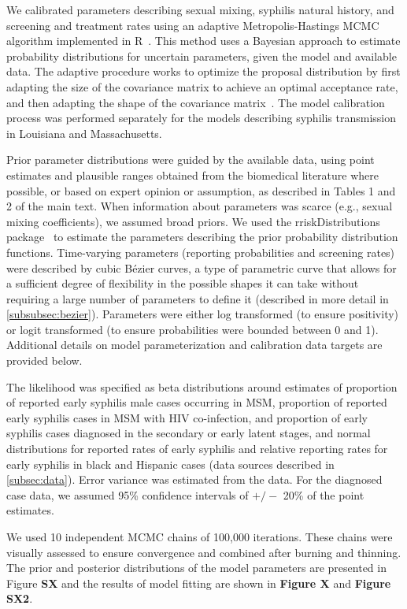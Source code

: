 \documentclass[a4paper]{article}
\begin{document}
We calibrated parameters describing sexual mixing, syphilis natural history, and screening and treatment rates using an adaptive Metropolis-Hastings MCMC algorithm implemented in R~\autocite{Camacho2016}. This method uses a Bayesian approach to estimate probability distributions for uncertain parameters, given the model and available data. The adaptive procedure works to optimize the proposal distribution by first adapting the size of the covariance matrix to achieve an optimal acceptance rate, and then adapting the shape of the covariance matrix~\autocite{Camacho2015}. The model calibration process was performed separately for the models describing syphilis transmission in Louisiana and Massachusetts.

Prior parameter distributions were guided by the available data, using point estimates and plausible ranges obtained from the biomedical literature where possible, or based on expert opinion or assumption, as described in Tables 1 and 2 of the main text. When information about parameters was scarce (e.g., sexual mixing coefficients), we assumed broad priors. We used the rriskDistributions package~\autocite{Belgorodski2016} to estimate the parameters describing the prior probability distribution functions. Time-varying parameters (reporting probabilities and screening rates) were described by cubic Bézier curves, a type of parametric curve that allows for a sufficient degree of flexibility in the possible shapes it can take without requiring a large number of parameters to define it (described in more detail in \ref{subsubsec:bezier}). Parameters were either log transformed (to ensure positivity) or logit transformed (to ensure probabilities were bounded between 0 and 1). Additional details on model parameterization and calibration data targets are provided below.

The likelihood was specified as beta distributions around estimates of proportion of reported early syphilis male cases occurring in MSM, proportion of reported early syphilis cases in MSM with HIV co-infection, and proportion of early syphilis cases diagnosed in the secondary or early latent stages, and normal distributions for reported rates of early syphilis and relative reporting rates for early syphilis in black and Hispanic cases (data sources described in \ref{subsec:data}). Error variance was estimated from the data. For the diagnosed case data, we assumed 95\% confidence intervals of $+/-$ 20\% of the point estimates. 

We used 10 independent MCMC chains of 100,000 iterations. These chains were visually assessed to ensure convergence and combined after burning and thinning. The prior and posterior distributions of the model parameters are presented in Figure \textbf{SX} and the results of model fitting are shown in \textbf{Figure X} and \textbf{Figure SX2}. 
\end{document}
